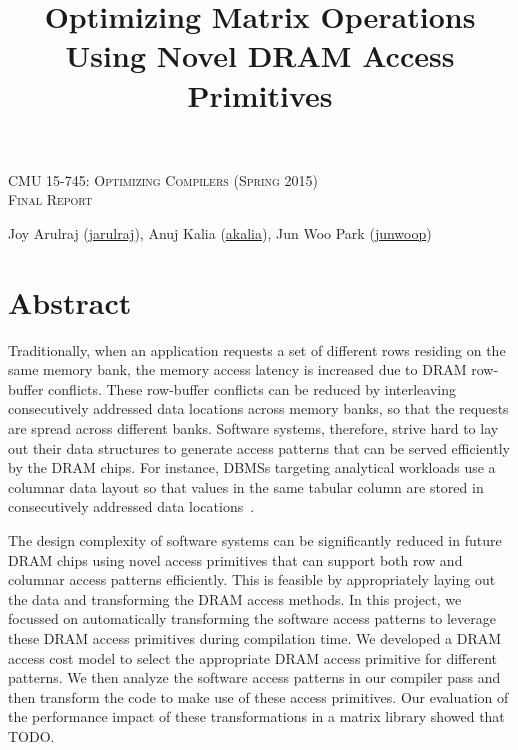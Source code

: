 \documentclass[letterpaper]{article}
\makeatletter
\newcommand{\email}[1]{\href{mailto:#1@cs.cmu.edu}{#1}}
\makeatother
\begin{document}
\title{Optimizing Matrix Operations Using Novel DRAM
  Access Primitives}
 \author{}
\date{}
\maketitle
\begin{center}
  \textsc{\large CMU 15-745: Optimizing Compilers (Spring 2015)} \\
  \vspace{1em}
  \textsc{\large Final Report} \\
  \vspace{1em}
  \centerline{\large{Joy Arulraj (\email{jarulraj}), Anuj Kalia
    (\email{akalia})}, Jun Woo Park (\email{junwoop}) }
  \vspace{1em}
\end{center}

\section{Abstract}

Traditionally, when an application requests a set of different rows
residing on the same memory bank, the memory access latency is
increased due to DRAM row-buffer conflicts.
These row-buffer conflicts can be reduced by interleaving
consecutively addressed data locations across memory banks, so that
the requests are spread across different banks.
Software systems, therefore, strive hard to lay out their data structures
to generate access patterns that can be served efficiently by
the DRAM chips.
For instance, DBMSs targeting analytical workloads use a columnar data
layout so that values in the same tabular column are stored in
consecutively addressed data locations~\cite{col1}.

The design complexity of software systems can be significantly
reduced in future DRAM chips using novel access primitives that can
support both row and columnar access patterns efficiently.
This is feasible by appropriately laying out the data and transforming
the DRAM access methods.
In this project, we focussed on automatically
transforming the software access patterns to leverage these
DRAM access primitives during compilation time.
We developed a DRAM access cost model to select the appropriate DRAM
access primitive for different patterns. We then
analyze the software access patterns in our compiler pass and then
transform the code to make use of these access primitives.
Our evaluation of the performance impact of these transformations in
a matrix library showed that TODO.
\end{document}
